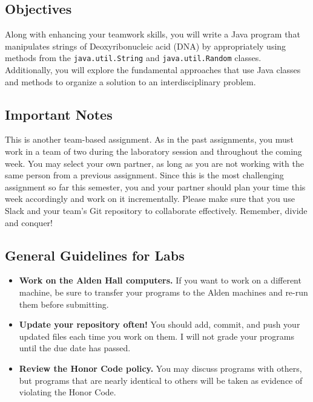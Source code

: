 



\subsection*{Objectives}
\vspace{-0.05in}

Along with enhancing your teamwork skills, you will write a Java program that manipulates strings of Deoxyribonucleic
acid (DNA) by appropriately using methods from the {\tt java.util.String} and {\tt java.util.Random} classes.
Additionally, you will explore the fundamental approaches that use Java classes and methods to organize a solution to an
interdisciplinary problem.

\vspace{-0.05in}
\subsection*{Important Notes}
\vspace{-0.05in}

This is another team-based assignment. As in the past assignments, you must work in a team of two during the laboratory
session and throughout the coming week. You may select your own partner, as long as you are not working with the same
person from a previous assignment. Since this is the most challenging assignment so far this semester, you and your
partner should plan your time this week accordingly and work on it incrementally. Please make sure that you use Slack
and your team's Git repository to collaborate effectively. Remember, divide and conquer!

\vspace{-0.05in}
\subsection*{General Guidelines for Labs}
\vspace{-0.05in}

\begin{itemize}

  \itemsep 0in

\item
{\bf Work on the Alden Hall computers.} If you want to work on a different
machine, be sure to transfer your programs to the Alden
machines and re-run them before submitting.
\item
{\bf Update your repository often!} You should add, commit,
and push your updated files each time you work on them.  I will not grade
your programs until the due date has passed.
\item
{\bf Review the Honor Code policy.} You
may discuss programs with others, but programs that are nearly identical
to others will be taken as evidence of violating the Honor Code.
\end{itemize}

